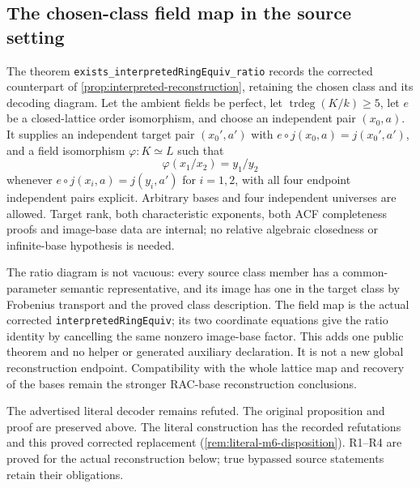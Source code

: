 \documentclass[11pt,oneside]{article}
\theoremstyle{definition}
\theoremstyle{remark}
\newcommand{\lean}[1]{\nolinkurl{#1}}
\begin{document}
\subsection{The chosen-class field map in the source setting}

The theorem \lean{exists_interpretedRingEquiv_ratio} records the corrected counterpart
of \cref{prop:interpreted-reconstruction}, retaining the chosen class and its decoding
diagram. Let the ambient fields be perfect, let $\operatorname{trdeg}(K/k)\geq5$, let
$e$ be a closed-lattice order isomorphism, and choose an independent pair $(x_0,a)$.
It supplies an independent target pair $(x_0',a')$ with
$e\circ j(x_0,a)=j(x_0',a')$, and a field isomorphism $\varphi:K\simeq L$ such that
\[
 \varphi(x_1/x_2)=y_1/y_2
\]
whenever $e\circ j(x_i,a)=j(y_i,a')$ for $i=1,2$, with all four endpoint independent
pairs explicit. Arbitrary bases and four independent universes are allowed. Target rank,
both characteristic exponents, both ACF completeness proofs and image-base data are
internal; no relative algebraic closedness or infinite-base hypothesis is needed.

The ratio diagram is not vacuous: every source class member has a common-parameter
semantic representative, and its image has one in the target class by Frobenius
transport and the proved class description. The field map is the actual corrected
\lean{interpretedRingEquiv}; its two coordinate equations give the ratio identity by
cancelling the same nonzero image-base factor. This adds one public theorem and no
helper or generated auxiliary declaration. It is not a new global reconstruction
endpoint. Compatibility with the whole lattice map and recovery of the bases remain
the stronger RAC-base reconstruction conclusions.

The advertised literal decoder remains refuted. The original proposition and proof
are preserved above. The literal construction has the recorded refutations and this proved
corrected replacement (\cref{rem:literal-m6-disposition}). R1--R4 are proved for the actual
reconstruction below; true bypassed source statements retain their obligations.
\end{document}
